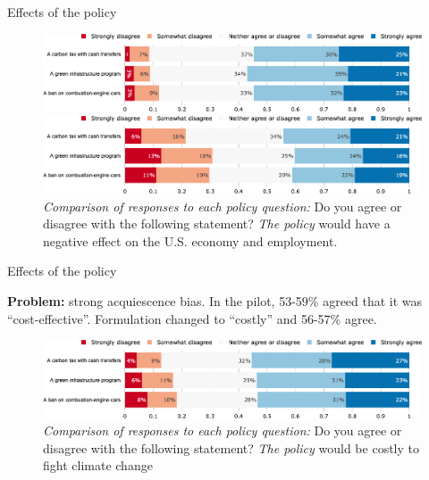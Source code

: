 \documentclass[aspectratio=169,9pt,dvipsnames]{beamer}
\begin{document}
\begin{frame}{Effects of the policy}%
\begin{figure}[h!]
\centering
\caption{\textit{Comparison of responses to each policy question:} Do you agree or disagree with the following statement? \textit{The policy} would have a large effect on the U.S. economy and employment.}
\includegraphics[width=.9\textwidth]{../figures/US/policies_large_effect_US.png}
\vspace{-.1cm}
\centering
\caption{\textit{Comparison of responses to each policy question:} Do you agree or disagree with the following statement? \textit{The policy} would have a negative effect on the U.S. economy and employment.}
\includegraphics[width=.9\textwidth]{../figures/US/policies_negative_effect_US.png}
\end{figure}
\end{frame}

\begin{frame}{Effects of the policy}%

\textbf{Problem:} strong acquiescence bias. In the pilot, 53-59\% agreed that it was ``cost-effective''. Formulation changed to ``costly'' and 56-57\% agree.
\begin{figure}[h!]
\vspace{-.1cm}
\centering
\caption{\textit{Comparison of responses to each policy question:} Do you agree or disagree with the following statement? \textit{The policy} would be costly to fight climate change}
\includegraphics[width=\textwidth]{../figures/US/policies_cost_effective_US.png}
\end{figure}
\end{frame}
\end{document}
